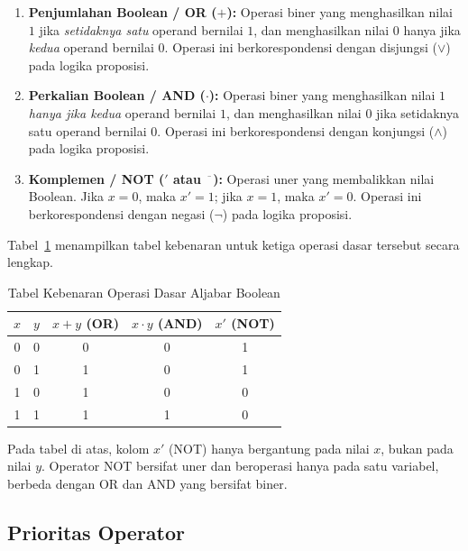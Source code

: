 \begin{enumerate}[label=\textbf{\arabic*.}, itemsep=8pt]
  \item \textbf{Penjumlahan Boolean / OR ($+$):} Operasi biner yang menghasilkan nilai $1$ jika \emph{setidaknya satu} operand bernilai $1$, dan menghasilkan nilai $0$ hanya jika \emph{kedua} operand bernilai $0$. Operasi ini berkorespondensi dengan disjungsi ($\vee$) pada logika proposisi.

  \item \textbf{Perkalian Boolean / AND ($\cdot$):} Operasi biner yang menghasilkan nilai $1$ \emph{hanya jika kedua} operand bernilai $1$, dan menghasilkan nilai $0$ jika setidaknya satu operand bernilai $0$. Operasi ini berkorespondensi dengan konjungsi ($\wedge$) pada logika proposisi.

  \item \textbf{Komplemen / NOT ($'$ atau $\overline{\phantom{x}}$):} Operasi uner yang membalikkan nilai Boolean. Jika $x = 0$, maka $x' = 1$; jika $x = 1$, maka $x' = 0$. Operasi ini berkorespondensi dengan negasi ($\neg$) pada logika proposisi.
\end{enumerate}

Tabel~\ref{tab:operasi-dasar-boolean} menampilkan tabel kebenaran untuk ketiga operasi dasar tersebut secara lengkap.

\begin{table}[H]
\centering
\renewcommand{\arraystretch}{1.3}
\begin{tabular}{|c|c||c|c|c|}
\hline
$x$ & $y$ & $x + y$ (OR) & $x \cdot y$ (AND) & $x'$ (NOT) \\ \hline
0 & 0 & 0 & 0 & 1 \\ \hline
0 & 1 & 1 & 0 & 1 \\ \hline
1 & 0 & 1 & 0 & 0 \\ \hline
1 & 1 & 1 & 1 & 0 \\ \hline
\end{tabular}
\caption{Tabel Kebenaran Operasi Dasar Aljabar Boolean}
\label{tab:operasi-dasar-boolean}
\end{table}

\begin{catatan}
Pada tabel di atas, kolom $x'$ (NOT) hanya bergantung pada nilai $x$, bukan pada nilai $y$. Operator NOT bersifat uner dan beroperasi hanya pada satu variabel, berbeda dengan OR dan AND yang bersifat biner.
\end{catatan}

\subsection{Prioritas Operator}

